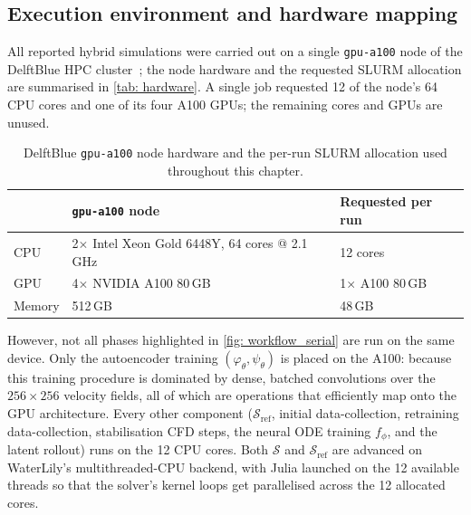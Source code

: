 \subsection{Execution environment and hardware mapping}
\label{subsect: 4_hardware}

All reported hybrid simulations were carried out on a single \texttt{gpu-a100} node of the DelftBlue HPC cluster~\cite{DHPC2024}; the node hardware and the requested SLURM allocation are summarised in \autoref{tab: hardware}. A single job requested 12 of the node's 64 CPU cores and one of its four A100 GPUs; the remaining cores and GPUs are unused.

\begin{table}[htbp]
  \centering
  \begin{tabular}{lll}
    \toprule
              & \texttt{gpu-a100} node                              & Requested per run \\
    \midrule
    CPU       & 2$\times$ Intel Xeon Gold 6448Y, 64 cores @ 2.1\,GHz & 12 cores          \\
    GPU       & 4$\times$ NVIDIA A100 80\,GB                         & 1$\times$ A100 80\,GB \\
    Memory    & 512\,GB                                             & 48\,GB            \\
    \bottomrule
  \end{tabular}
   \caption{DelftBlue \texttt{gpu-a100} node hardware and the per-run SLURM allocation used throughout this chapter.}
  \label{tab: hardware}
\end{table}

However, not all phases highlighted in \autoref{fig: workflow_serial} are run on the same device. Only the autoencoder training $(\varphi_\theta,\psi_\theta)$ is placed on the A100: because this training procedure is dominated by dense, batched convolutions over the $256\times256$ velocity fields, all of which are operations that efficiently map onto the GPU architecture. Every other component ($\mathcal{S}_\text{ref}$, initial data-collection, retraining data-collection, stabilisation CFD steps, the neural ODE training $f_\phi$, and the latent rollout) runs on the 12 CPU cores. Both $\mathcal{S}$ and $\mathcal{S}_\text{ref}$ are advanced on WaterLily's multithreaded-CPU backend, with Julia launched on the 12 available threads so that the solver's kernel loops get parallelised across the 12 allocated cores.

